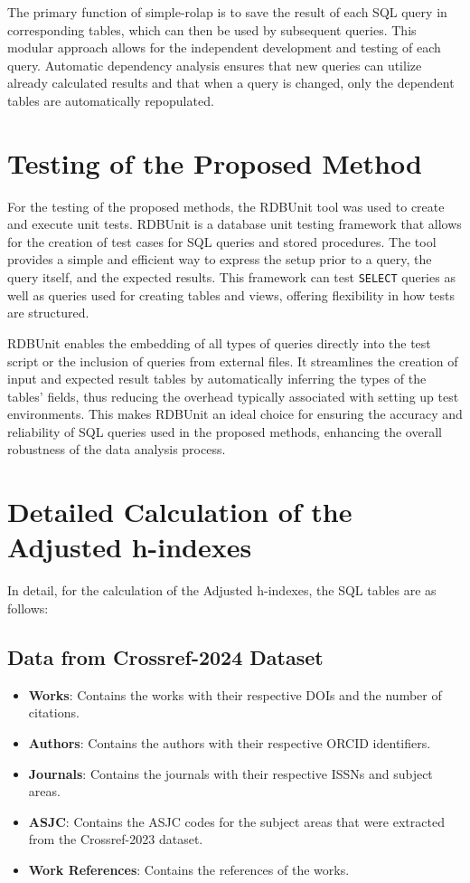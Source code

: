 The primary function of simple-rolap is to save the result of each SQL query in
corresponding tables, which can then be used by subsequent queries. This
modular approach allows for the independent development and testing of each
query. Automatic dependency analysis ensures that new queries can utilize
already calculated results and that when a query is changed, only the dependent
tables are automatically repopulated.

\section{Testing of the Proposed Method}
For the testing of the proposed methods, the RDBUnit \cite{rdbunit} tool was
used to create and execute unit tests. RDBUnit is a
database unit testing framework that allows for the creation of test cases for
SQL queries and stored procedures. The tool provides a simple and efficient way
to express the setup prior to a query, the query itself, and the expected
results. This framework can test \texttt{SELECT} queries as well as queries
used for creating tables and views, offering flexibility in how tests are
structured.

RDBUnit enables the embedding of all types of queries directly into the test
script or the inclusion of queries from external files. It streamlines the
creation of input and expected result tables by automatically inferring the
types of the tables' fields, thus reducing the overhead typically associated
with setting up test environments. This makes RDBUnit an ideal choice for
ensuring the accuracy and reliability of SQL queries used in the proposed
methods, enhancing the overall robustness of the data analysis process.

\section{Detailed Calculation of the Adjusted h-indexes}

In detail, for the calculation of the Adjusted h-indexes, the SQL tables are as
follows:

\subsection{Data from Crossref-2024 Dataset}
\begin{itemize}
      \item \textbf{Works}: Contains the works with their respective DOIs and the number of citations.
      \item \textbf{Authors}: Contains the authors with their respective ORCID identifiers.
      \item \textbf{Journals}: Contains the journals with their respective ISSNs and subject areas.
      \item \textbf{ASJC}: Contains the ASJC codes for the subject areas that were extracted from the Crossref-2023 dataset.
      \item \textbf{Work References}: Contains the references of the works.
\end{itemize}

